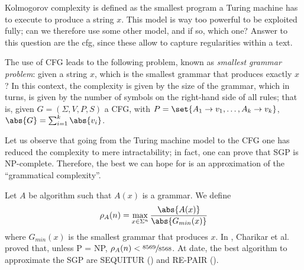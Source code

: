 \documentclass{subfiles}
\begin{document}
    Kolmogorov complexity is defined as the smallest program a Turing machine has to execute 
        to produce a string \(x\). This model is way too powerful to be exploited fully;
        can we therefore use some other model, and if so, which one?
        Answer to this question are the \gls{cfg}, since these allow to capture regularities 
        within a text.

    The use of CFG leads to the following problem, known as \emph{smallest grammar problem}:
        given a string \(x\), which is the smallest grammar that produces exactly \(x\)?
        In this context, the complexity is given by the size of the grammar, which in turns,
        is given by the number of symbols on the right-hand side of all rules; that is,
        given \(G = (\Sigma, V, P, S)\) a CFG, with \(P = \set{A_{1} \to v_{1}, \ldots, A_{k} \to v_{k}}\),
        \(\abs{G} = \sum_{i=1}^{k}{\abs{v_{i}}}\).

    Let us observe that going from the Turing machine model to the CFG one has reduced the complexity
        to mere intractability; in fact, one can prove that SGP is NP-complete.
        Therefore, the best we can hope for is an approximation of the ``grammatical complexity''.

    Let \(A\) be algorithm such that \(A(x)\) is a grammar. We define 
        \[
            \rho_{A}(n) = \max\limits_{x \in \Sigma^{n}} \frac{\abs{A(x)}}{\abs{G_{min}(x)}}
        \]
        where \(G_{min}(x)\) is the smallest grammar that produces \(x\).
        In \cite{charikar2005} , Charikar et al. proved that, unless P = NP, \(\rho_{A}(n) < \sfrac{8569}{8568}\).
        At date, the best algorithm to approximate the SGP are SEQUITUR (\cite{witten1997}) and RE-PAIR (\cite{larsson2000}).
\end{document}
